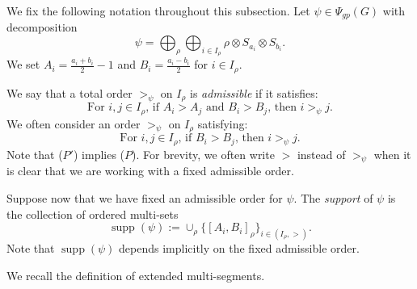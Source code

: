\documentclass[11pt,letterpaper]{amsart}
\DeclareMathOperator{\supp}{supp}
\numberwithin{equation}{section}
\begin{document}
We fix the following notation throughout this subsection. Let $\psi\in\Psi_{gp}(G)$ with decomposition 
\[ \psi= \bigoplus_{\rho} \bigoplus_{i \in I_{\rho}} \rho \otimes S_{a_i} \otimes S_{b_i}. \]
We set $A_i=\frac{a_i+b_i}{2}-1$ and $B_i=\frac{a_i-b_i}{2}$ for $i\in I_\rho.$ 
 
We say that a total order $>_\psi$ on $I_\rho$ is \emph{admissible} if it satisfies:
\[
\tag{$P$}
\text{
For $i,j \in I_\rho$, 
if $A_i > A_j$ and $B_i > B_j$, 
then $i >_\psi j$.
}
\]
We often consider an order $>_\psi$ on $I_\rho$ satisfying:
\[
\tag{$P'$}
\text{
For $i,j \in I_\rho$, 
if $B_i > B_j$, 
then $i >_\psi j$.
}
\]
Note that ($P'$) implies ($P$). For brevity, we often write $>$ instead of $>_\psi$ when it is clear that we are working with a fixed admissible order. 

Suppose now that we have fixed an admissible order for $\psi.$ The \emph{support} of $\psi$ is the collection of ordered multi-sets 
$$\supp(\psi) := \cup_{\rho}\{ [A_i,B_i]_{\rho} \}_{i \in (I_\rho,>)}.
$$
Note that $\supp(\psi)$ depends implicitly on the fixed admissible order.

We recall the definition of extended multi-segments.
\end{document}
